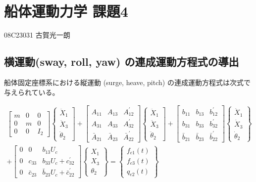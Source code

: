 \documentclass{article}
\begin{document}
\section*{船体運動力学 課題4}
08C23031
古賀光一朗

\subsection*{横運動(sway, roll, yaw) の連成運動方程式の導出}

船体固定座標系における縦運動 (surge, heave, pitch) の連成運動方程式は次式で与えられている。

$$
\begin{array}{c}
\left[\begin{array}{ccc}
m & 0 & 0 \\
0 & m & 0 \\
0 & 0 & I_{2}
\end{array}\right]\left\{\begin{array}{c}
\ddot{X}_{1} \\
\ddot{X}_{3} \\
\ddot{\theta}_{2}
\end{array}\right]+\left[\begin{array}{ccc}
A_{11} & A_{13} & A_{12}^{\prime} \\
A_{31} & A_{33} & A_{32}^{\prime} \\
\bar{A}_{21} & \bar{A}_{23} & \bar{A}_{22}^{\prime}
\end{array}\right]\left\{\begin{array}{c}
\ddot{X}_{1} \\
\ddot{X}_{3} \\
\ddot{\theta}_{2}
\end{array}\right]+\left[\begin{array}{ccc}
b_{11} & b_{13} & b_{12}^{\prime} \\
b_{31} & b_{33} & b_{32}^{\prime} \\
\bar{b}_{21} & \bar{b}_{23} & \bar{b}_{22}^{\prime}
\end{array}\right]\left\{\begin{array}{c}
\dot{X}_{1} \\
\dot{X}_{3} \\
\dot{\theta}_{2}
\end{array}\right\} \\
+\left[\begin{array}{ccc}
0 & 0 & b_{13} U_{c} \\
0 & c_{33} & b_{33} U_{c}+c_{32}^{\prime} \\
0 & \bar{c}_{23} & \bar{b}_{23} U_{c}+\bar{c}_{22}^{\prime}
\end{array}\right]\left\{\begin{array}{c}
X_{1} \\
X_{3} \\
\theta_{2}
\end{array}\right\}=\left\{\begin{array}{c}
f_{e 1}(t) \\
f_{e 3}(t) \\
q_{e 2}(t)
\end{array}\right\}
\end{array}
$$
\end{document}
